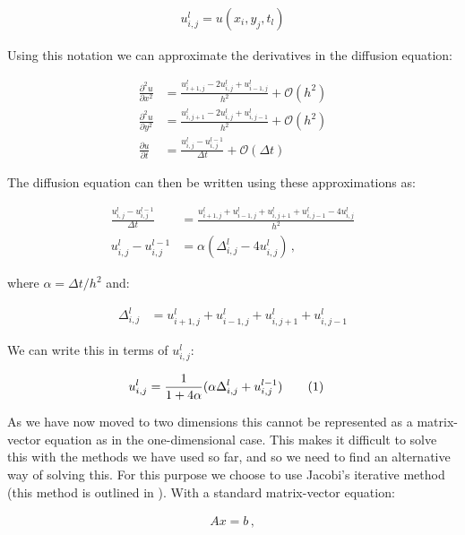 \documentclass[reprint,english,notitlepage]{revtex4-1}  %
\newcommand\numberthis{\addtocounter{equation}{1}\tag{\theequation}}
\begin{document}
\begin{align*}
u_{i,j}^l = u(x_i,y_j,t_l)
\end{align*}

Using this notation we can approximate the derivatives in the diffusion equation:

\begin{align*}
\frac{\partial^2 u}{\partial x^2} &= \frac{u_{i+1,j}^l - 2u_{i,j}^l + u_{i-1,j}^l}{h^2} + \mathcal{O}(h^2) \\
\frac{\partial^2 u}{\partial y^2} &= \frac{u_{i,j+1}^l - 2u_{i,j}^l + u_{i,j-1}^l}{h^2} + \mathcal{O}(h^2)\\
\frac{\partial u}{\partial t} &= \frac{u_{i,j}^l - u_{i,j}^{l-1} }{\Delta t} + \mathcal{O}(\Delta t)
\end{align*}

The diffusion equation can then be written using these approximations as:

\begin{align*}
\frac{u_{i,j}^l - u_{i,j}^{l-1} }{\Delta t}  &= \frac{u_{i+1,j}^l + u_{i-1,j}^l + u_{i,j+1}^l + u_{i,j-1}^l - 4u_{i,j}^l}{h^2} \\
u_{i,j}^l - u_{i,j}^{l-1} &= \alpha(\Delta_{i,j}^l - 4u_{i,j}^l) \, , 
\end{align*}

where $\alpha = \Delta t /h^2$ and:

\begin{align*}
\Delta_{i,j}^l &= u_{i+1,j}^l + u_{i-1,j}^l + u_{i,j+1}^l + u_{i,j-1}^l
\end{align*}

We can write this in terms of $u_{i,j}^l$:

\begin{align*}
u_{i,j}^l &= \frac{1}{1 + 4\alpha} (\alpha \Delta_{i,j}^l + u_{i,j}^{l-1} ) \numberthis \label{eq:2D_diff_eq_numerical_solution}
\end{align*}

As we have now moved to two dimensions this cannot be represented as a matrix-vector equation as in the one-dimensional case. This makes it difficult to solve this with the methods we have used so far, and so we need to find an alternative way of solving this. For this purpose we choose to use Jacobi's iterative method (this method is outlined in \cite[p~.189-190]{Hjorth-Jensen2015}). With a standard matrix-vector equation:

\begin{align*}
Ax = b \, ,
\end{align*}
\end{document}
